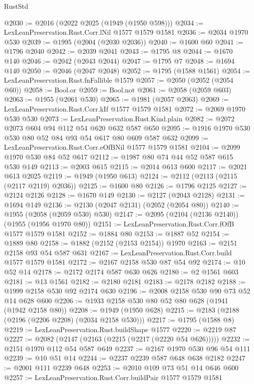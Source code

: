 \begin{lexlean}{RustStd}
\begin{coremodule}
@2030 := @2016 (@2022 @2025 (@1949 (@1950 @598)))
@2034 := LexLeanPreservation.Rust.Corr.lNil @1577 @1579 @1581
@2036 := @2034 @1970 @530
@2039 := @1995 (@2004 (@2030 @2036))
@2040 := @1600 @60
@2041 := @1796 @2040
@2042 := @2039 @2041
@2043 := @1795 @8
@2044 := @1670 @140
@2046 := @2042 (@2043 @2044)
@2047 := @1795 @7
@2048 := @1694 @140
@2050 := @2046 (@2047 @2048)
@2052 := @1795 (@1588 @1561)
@2054 := LexLeanPreservation.Rust.fnFallible @1579
@2057 := @2050 (@2052 (@2054 @60))
@2058 := Bool.or
@2059 := Bool.not
@2061 := @2058 (@2059 @603)
@2063 := @1955 (@2061 @530)
@2065 := @1981 (@2057 @2063)
@2069 := LexLeanPreservation.Rust.Corr.kIf @1577 @1579 @1581
@2072 := @2069 @1970 @530 @530
@2073 := LexLeanPreservation.Rust.Kind.plain
@2082 := @2072 @2073 @604 @94 @112 @54 @620 @632 @587 @650
@2095 := @1916 @1970 @530 @530 @80 @52 @84 @93 @54 @617 @80 @609 @587 @632
@2099 := LexLeanPreservation.Rust.Corr.eOfBNil @1577 @1579 @1581
@2104 := @2099 @1970 @530 @84 @52 @617
@2112 := @1987 @80 @74 @44 @52 @587 @615 @530 @149
@2113 := @2003 @615
@2115 := @2014 @613 @600
@2117 := @2021 @613 @2025
@2119 := @1949 (@1950 @613)
@2124 := @2112 (@2113 (@2115 (@2117 @2119) @2036))
@2125 := @1600 @80
@2126 := @1796 @2125
@2127 := @2124 @2126
@2128 := @1670 @149
@2130 := @2127 (@2043 @2128)
@2131 := @1694 @149
@2136 := @2130 (@2047 @2131) (@2052 (@2054 @80))
@2140 := @1955 (@2058 (@2059 @530) @530)
@2147 := @2095 (@2104 (@2136 @2140)) (@1955 (@1956 @1970 @80))
@2151 := LexLeanPreservation.Rust.Corr.fOfB @1577 @1579 @1581
@2152 := @1884 @80
@2153 := @1887 @52
@2154 := @1889 @80
@2158 := @1882 (@2152 (@2153 @2154)) @1970
@2163 := @2151 @2158 @93 @54 @587 @631
@2167 := LexLeanPreservation.Rust.Corr.build @1577 @1579 @1581
@2172 := @2167 @2158 @530 @87 @54 @92
@2174 := @10 @52 @14
@2178 := @2172 @2174 @587 @630 @626
@2180 := @2 @1561 @603
@2181 := @13 @1561
@2182 := @2180 @2181
@2183 := @2178 @2182
@2188 := @1999 @2158 @530 @92 @2174 @630
@2196 := @2008 @2158 @530 @90 @73 @52 @14 @628 @600
@2206 := @1933 @2158 @530 @80 @52 @80 @628 (@1941 (@1942 @2158 @80))
@2208 := @1949 (@1950 @628)
@2215 := @2183 (@2188 (@2196 (@2206 @2208) (@2034 @2158 @530)))
@2217 := @1795 (@1588 @8)
@2219 := LexLeanPreservation.Rust.buildShape @1577
@2220 := @2219 @87
@2227 := @2082 (@2147 (@2163 (@2215 (@2217 (@2220 @54 @626)))))
@2232 := @2151 @1970 @112 @54 @587 @649
@2237 := @2167 @1970 @530 @96 @54 @111
@2239 := @10 @51 @14
@2244 := @2237 @2239 @587 @648 @638 @2182
@2247 := @2001 @111 @2239 @648
@2253 := @2010 @109 @73 @51 @14 @646 @600
@2257 := LexLeanPreservation.Rust.Corr.buildPair @1577 @1579 @1581

\end{coremodule}
\end{lexlean}

